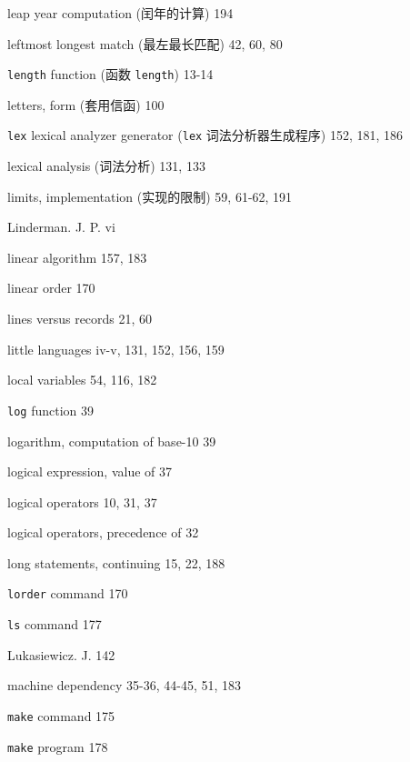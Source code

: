 \begin{multicols}{3}
\hangindent=3pc  leap year computation (闰年的计算) 194

\hangindent=3pc  leftmost longest match (最左最长匹配) 42, 60, 80

\hangindent=3pc  \verb'length' function (函数 \verb'length') 13-14

\hangindent=3pc  letters, form (套用信函) 100

\hangindent=3pc  \verb'lex' lexical analyzer generator
(\verb'lex' 词法分析器生成程序) 152, 181, 186

\hangindent=3pc  lexical analysis (词法分析) 131, 133

\hangindent=3pc  limits, implementation (实现的限制) 59, 61-62, 191

\hangindent=3pc  Linderman. J. P. vi

\hangindent=3pc  linear algorithm 157, 183

\hangindent=3pc  linear order 170

\hangindent=3pc  lines versus records 21, 60

\hangindent=3pc  little languages iv-v, 131, 152, 156, 159

\hangindent=3pc  local variables 54, 116, 182

\hangindent=3pc  \verb'log' function 39

\hangindent=3pc  logarithm, computation of base-10 39

\hangindent=3pc  logical expression, value of 37

\hangindent=3pc  logical operators 10, 31, 37

\hangindent=3pc  logical operators, precedence of 32

\hangindent=3pc  long statements, continuing 15, 22, 188

\hangindent=3pc  \verb'lorder' command 170

\hangindent=3pc  \verb'ls' command 177

\hangindent=3pc  Lukasiewicz. J. 142

\hangindent=3pc  machine dependency 35-36, 44-45, 51, 183

\hangindent=3pc  \verb'make' command 175

\hangindent=3pc  \verb'make' program 178


\end{multicols}

